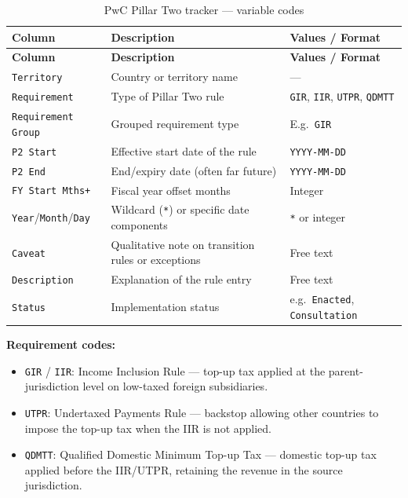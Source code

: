 \documentclass[11pt,a4paper]{article}
\begin{document}
\begin{longtable}{L{2.8cm} L{6.5cm} C{3.5cm}}
    \caption{PwC Pillar Two tracker --- variable codes}
    \label{tab:pwc_p2}\\
    \toprule
    \textbf{Column} & \textbf{Description} & \textbf{Values / Format} \\
    \midrule
    \endfirsthead
    \toprule
    \textbf{Column} & \textbf{Description} & \textbf{Values / Format} \\
    \midrule
    \endhead
    \bottomrule
    \endlastfoot
    \texttt{Territory}        & Country or territory name & --- \\
    \texttt{Requirement}      & Type of Pillar Two rule & \texttt{GIR}, \texttt{IIR}, \texttt{UTPR}, \texttt{QDMTT} \\
    \texttt{Requirement Group}& Grouped requirement type & E.g.\ \texttt{GIR} \\
    \texttt{P2 Start}         & Effective start date of the rule & \texttt{YYYY-MM-DD} \\
    \texttt{P2 End}           & End/expiry date (often far future) & \texttt{YYYY-MM-DD} \\
    \texttt{FY Start Mths+}   & Fiscal year offset months & Integer \\
    \texttt{Year}/\texttt{Month}/\texttt{Day} & Wildcard (\texttt{*}) or specific date components & \texttt{*} or integer \\
    \texttt{Caveat}           & Qualitative note on transition rules or exceptions & Free text \\
    \texttt{Description}      & Explanation of the rule entry & Free text \\
    \texttt{Status}           & Implementation status & e.g.\ \texttt{Enacted}, \texttt{Consultation} \\
\end{longtable}

\noindent\textbf{Requirement codes:}
\begin{itemize}[noitemsep]
    \item \texttt{GIR} / \texttt{IIR}: Income Inclusion Rule --- top-up tax applied
    at the parent-jurisdiction level on low-taxed foreign subsidiaries.
    \item \texttt{UTPR}: Undertaxed Payments Rule --- backstop allowing other
    countries to impose the top-up tax when the IIR is not applied.
    \item \texttt{QDMTT}: Qualified Domestic Minimum Top-up Tax --- domestic
    top-up tax applied before the IIR/UTPR, retaining the revenue in the source
    jurisdiction.
\end{itemize}
\end{document}
